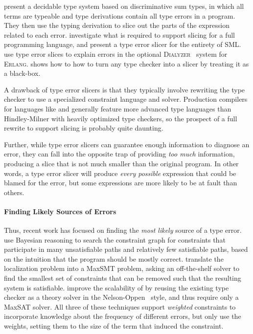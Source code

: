 \citet{Neubauer2003-xv} present a decidable type system based on
discriminative sum types, in which all terms are typeable and type
derivations contain all type errors in a program. They then use the
typing derivation to slice out the parts of the expression related to
each error.
%
\citet{Rahli2010-ps,Rahli2015-tt} investigate what is required to
support slicing for a full programming language, and present a type
error slicer for the entirety of \textsc{SML}.
%
\citet{Sagonas2013-bf} use type error slices to explain errors in the
optional \textsc{Dialyzer}~\citep{Lindahl2006-hz} system for
\textsc{Erlang}.
%
\citet{Schilling2011-yf} shows how to how to turn any type checker
into a slicer by treating it as a black-box.

A drawback of type error slicers is that they typically involve
rewriting the type checker to use a specialized constraint language and
solver.
%
Production compilers for languages like \ocaml and \haskell generally
feature more advanced type languages than Hindley-Milner with heavily
optimized type checkers, so the prospect of a full rewrite to support
slicing is probably quite daunting.
%

Further, while type error slicers can guarantee enough information to
diagnose an error, they can fall into the opposite trap of providing
\emph{too much} information, producing a slice that is not much smaller
than the original program.
%
In other words, a type error slicer will produce \emph{every possible}
expression that could be blamed for the error, but some expressions are
more likely to be at fault than others.

\paragraph{Finding Likely Sources of Errors}
Thus, recent work has focused on finding the \emph{most likely} source
of a type error.
%
\citeauthor{Zhang2015-yu}~\citep{Zhang2014-lv,Zhang2015-yu} use Bayesian
reasoning to search the constraint graph for constraints that
participate in many unsatisfiable paths and relatively few satisfiable
paths, based on the intuition that the program should be mostly correct.
%
\citet{Pavlinovic2014-mr,Pavlinovic2015-kh} translate the localization
problem into a MaxSMT problem, asking an off-the-shelf solver to find
the smallest set of constraints that can be removed such that the
resulting system is satisfiable.
%
\citet{Loncaric2016-uk} improve the scalability of
\citeauthor{Pavlinovic2014-mr} by reusing the existing type checker as
a theory solver in the Nelson-Oppen~\citep{Nelson1979-td}
style, and thus require only a MaxSAT solver.
%
All three of these techniques support \emph{weighted} constraints to
incorporate knowledge about the frequency of different errors,
but only \citeauthor{Pavlinovic2014-mr} use the weights, setting them to
the size of the term that induced the constraint.


